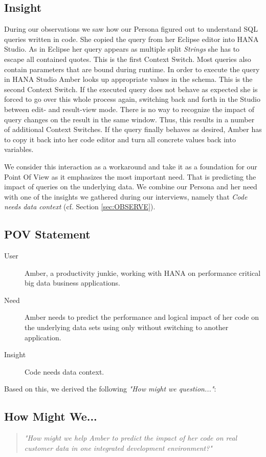 \subsection{Insight}

During our observations we saw how our Persona figured out to understand SQL queries written in code. She copied the query from her Eclipse editor into HANA Studio. As in Eclipse her query appears as multiple split \emph{Strings} she has to escape all contained quotes. This is the first Context Switch. Most queries also contain parameters that are bound during runtime. In order to execute the query in HANA Studio Amber looks up appropriate values in the schema. This is the second Context Switch. If the executed query does not behave as expected she is forced to go over this whole process again, switching back and forth in the Studio between edit- and result-view mode. There is no way to recognize the impact of query changes on the result in the same window. Thus, this results in a number of additional Context Switches. If the query finally behaves as desired, Amber has to copy it back into her code editor and turn all concrete values back into variables.

We consider this interaction as a workaround and take it as a foundation for our Point Of View as it emphasizes the most important need. That is predicting the impact of queries on the underlying data. We combine our Persona and her need with one of the insights we gathered during our interviews, namely that \textit{Code needs data context} (cf. Section \ref{sec:OBSERVE}).


\subsection{POV Statement}

\begin{description}
	\item [User] Amber, a productivity junkie, working with HANA on performance critical big data business applications.
	\item [Need] Amber needs to predict the performance and logical impact of her code on the underlying data sets using only without switching to another application.
	\item [Insight] Code needs data context.
\end{description}

Based on this, we derived the following \emph{"How might we question..."}:

\subsection{How Might We...}

\begin{quote}
\emph{"How might we help Amber to predict the impact of her code on real customer data in one integrated development environment?"}
\end{quote}